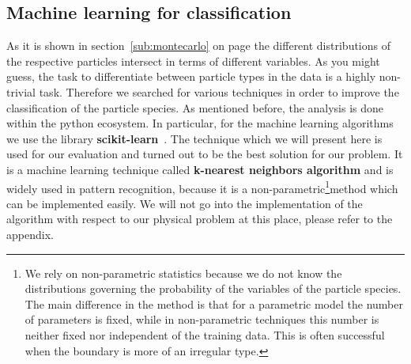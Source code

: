 \clearpage

\subsection{Machine learning for classification}
As it is shown in section~\ref{sub:montecarlo} on page \pageref{sub:montecarlo} 
the different distributions of the respective particles intersect in terms of different
variables. As you might guess, the task to differentiate between particle types in the 
data is a highly non-trivial task. Therefore we searched for various techniques in order
to improve the classification of the particle species. 
As mentioned before, the analysis is done within the python
ecosystem. In particular, for the machine learning algorithms we use the library 
\textbf{scikit-learn}~\cite{scikit-learn}. 
The technique which we will present
here is used for our evaluation and turned out to be the best solution for our problem.
It is a machine learning technique called \textbf{k-nearest neighbors algorithm} and
is widely used in pattern recognition, because it is a non-parametric\footnote{
We rely on non-parametric statistics because we do not know the distributions governing
the probability of the variables of the particle species. 
The main difference in the method is that for a parametric model
the number of parameters is fixed, while in non-parametric techniques this number is 
neither fixed nor independent of the training data. This is often successful when the boundary is 
more of an irregular type.
}method which can
be implemented easily. We will not go into the implementation of the algorithm with respect to our physical problem at this
place, please refer to the appendix.
